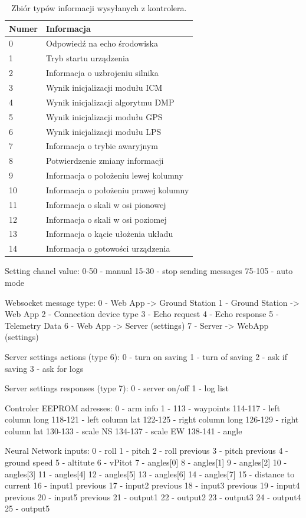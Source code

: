 \documentclass[12pt, a4paper]{article}
\begin{document}
\begin{table}[H]
\centering
\begin{tabular}{| l | l |}
\hline
\textbf{Numer} & \textbf{Informacja} \\
\hline
0 & Odpowiedź na echo środowiska \\
\hline
1 & Tryb startu urządzenia \\
\hline
2 & Informacja o uzbrojeniu silnika \\
\hline
3 & Wynik inicjalizacji modułu ICM \\
\hline
4 & Wynik inicjalizacji algorytmu DMP \\
\hline
5 & Wynik inicjalizacji modułu GPS \\
\hline
6 & Wynik inicjalizacji modułu LPS \\
\hline
7 & Informacja o trybie awaryjnym \\
\hline
8 & Potwierdzenie zmiany informacji \\
\hline
9 & Informacja o położeniu lewej kolumny \\
\hline
10 & Informacja o położeniu prawej kolumny \\
\hline
11 & Informacja o skali w osi pionowej \\
\hline
12 & Informacja o skali w osi poziomej \\
\hline
13 & Informacja o kącie ułożenia układu \\
\hline
14 & Informacja o gotowości urządzenia \\
\hline
\end{tabular}
\caption{Zbiór typów informacji wysyłanych z kontrolera.}
\end{table}



Setting chanel value:
0-50 - manual
15-30 - stop sending messages
75-105 - auto mode

Websocket message type:
0 - Web App -> Ground Station
1 - Ground Station -> Web App
2 - Connection device type
3 - Echo request
4 - Echo response
5 - Telemetry Data
6 - Web App -> Server (settings)
7 - Server -> WebApp (settings)

Server settings actions (type 6):
0 - turn on saving
1 - turn of saving
2 - ask if saving
3 - ask for logs

Server settings responses (type 7):
0 - server on/off
1 - log list

Controler EEPROM adresses:
0 - arm info
1 - 113 - waypoints
114-117 - left column long
118-121 - left column lat
122-125 - right column long
126-129 - right column lat
130-133 - scale NS
134-137 - scale EW
138-141 - angle 

Neural Network inputs:
0 - roll
1 - pitch
2 - roll previous
3 - pitch previous
4 - ground speed
5 - altitute
6 - vPitot
7 - angles[0]
8 - angles[1]
9 - angles[2]
10 - angles[3]
11 - angles[4]
12 - angles[5]
13 - angles[6]
14 - angles[7]
15 - distance to current
16 - input1 previous
17 - input2 previous
18 - input3 previous
19 - input4 previous
20 - input5 previous
21 - output1
22 - output2
23 - output3
24 - output4
25 - output5
\end{document}
